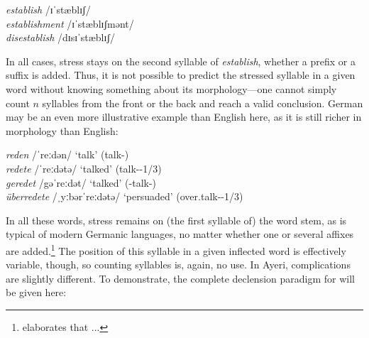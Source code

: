\ex
	\textit{establish} /ɪˈstæblɪʃ/\\
	\textit{establishment} /ɪˈstæblɪʃmənt/\\
	\textit{disestablish} /dɪsɪˈstæblɪʃ/
\xe

In all cases, stress stays on the second syllable of \textit{establish}, 
whether a prefix or a suffix is added. Thus, it is not possible to predict the 
stressed syllable in a given word without knowing something about its 
morphology---one cannot simply count $n$ syllables from the front or the 
back and reach a valid conclusion. German may be an even more illustrative 
example than English here, as it is still richer in morphology than English:

\ex
	\textit{reden} /ˈreːdən/ `talk' (talk-\Inf{})\\
	\textit{redete} /ˈreːdətə/ `talked' (talk-\Pst{}-1/3\Sg{})\\
	\textit{geredet} /gəˈreːdət/ `talked' (\Ptcp{}-talk-\Ptcp{})\\
	\textit{überredete} /ˌyːbərˈreːdətə/ `persuaded' (over.talk-\Pst{}-1/3\Sg{})
\xe

In all these words, stress remains on (the first syllable of) the word stem, as 
is typical of modern Germanic languages, no matter whether one or several 
affixes are added.\footnote{\citet[282--???]{wiese1996} elaborates that ...}
The position of this syllable in a given inflected word is 
effectively variable, though, so counting syllables is, again, no use. In Ayeri,
complications are slightly different. To demonstrate, the complete declension 
paradigm for  will be given here:

